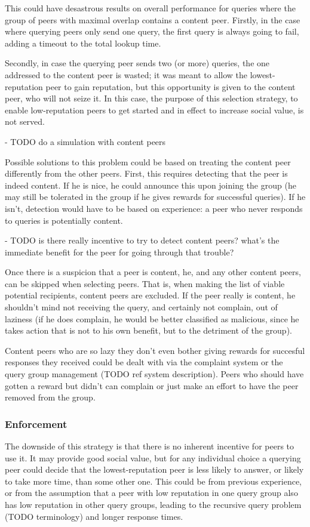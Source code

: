 This could have desastrous results on overall performance for queries where the
group of peers with maximal overlap contains a content peer. Firstly, in the
case where querying peers only send one query, the first query is always going
to fail, adding a timeout to the total lookup time.

Secondly, in case the querying peer sends two (or more) queries, the one
addressed to the content peer is wasted; it was meant to allow the
lowest-reputation peer to gain reputation, but this opportunity is given to the
content peer, who will not seize it. In this case, the purpose of this selection
strategy, to enable low-reputation peers to get started and in effect to
increase social value, is not served.

- TODO do a simulation with content peers

Possible solutions to this problem could be based on treating the content peer
differently from the other peers. First, this requires detecting that the peer
is indeed content. If he is nice, he could announce this upon joining the group
(he may still be tolerated in the group if he gives rewards for successful
queries). If he isn't, detection would have to be based on experience: a peer
who never responds to queries is potentially content.

- TODO is there really incentive to try to detect content peers? what's the
  immediate benefit for the peer for going through that trouble?

Once there is a suspicion that a peer is content, he, and any other content
peers, can be skipped when selecting peers. That is, when making the list of
viable potential recipients, content peers are excluded. If the peer really is
content, he shouldn't mind not receiving the query, and certainly not complain,
out of laziness (if he does complain, he would be better classified as
malicious, since he takes action that is not to his own benefit, but to the
detriment of the group).

Content peers who are so lazy they don't even bother giving rewards for
succesful responses they received could be dealt with via the complaint system
or the query group management (TODO ref system description). Peers who should
have gotten a reward but didn't can complain or just make an effort to have the
peer removed from the group.

\subsubsection{Enforcement}
\label{sec:selection_overlap_rep_sorted_enforcement}
The downside of this strategy is that there is no inherent incentive for peers
to use it. It may provide good social value, but for any individual choice a
querying peer could decide that the lowest-reputation peer is less likely to
answer, or likely to take more time, than some other one. This could be from
previous experience, or from the assumption that a peer with low reputation in
one query group also has low reputation in other query groups, leading to the
recursive query problem (TODO terminology) and longer response times.

